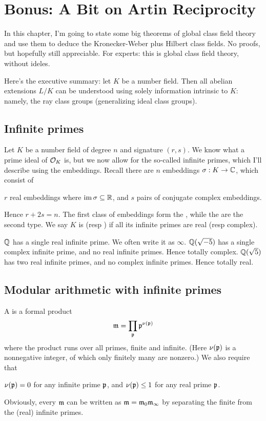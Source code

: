 \chapter{Bonus: A Bit on Artin Reciprocity}
In this chapter, I'm going to state some big theorems of
global class field theory and use them to deduce the
Kronecker-Weber plus Hilbert class fields.
No proofs, but hopefully still appreciable.
For experts: this is global class field theory, without ideles.

Here's the executive summary: let $K$ be a number field.
Then all abelian extensions $L/K$ can be understood
using solely information intrinsic to $K$:
namely, the ray class groups (generalizing ideal class groups).

\section{Infinite primes}
Let $K$ be a number field of degree $n$ and signature $(r,s)$.
We know what a prime ideal of $\mathcal O_K$ is,
but we now allow for the so-called infinite primes,
which I'll describe using the embeddings.
Recall there are $n$ embeddings $\sigma : K \to \mathbb C$, which consist of
\begin{itemize}
	\ii $r$ real embeddings where $\operatorname{im}\sigma \subseteq \mathbb R$, and
	\ii $s$ pairs of conjugate complex embeddings.
\end{itemize}
Hence $r+2s = n$.
The first class of embeddings form the ,
while the  are the second type.
We say $K$ is  (resp )
if all its infinite primes are real (resp complex).
\begin{example}
	\listhack
	\begin{itemize}
		\ii $\mathbb Q$ has a single real infinite prime.
		We often write it as $\infty$.
		\ii $\mathbb Q(\sqrt{-5})$ has a single complex infinite prime,
		and no real infinite primes. Hence totally complex.
		\ii $\mathbb Q(\sqrt{5})$ has two real infinite primes,
		and no complex infinite primes. Hence totally real.
	\end{itemize}
\end{example}

\section{Modular arithmetic with infinite primes}
A  is a formal product
\[ \mathfrak m = \prod_{\mathfrak p} \mathfrak p^{\nu(\mathfrak p)} \]
where the product runs over all primes, finite and infinite.
(Here $\nu(\mathfrak p)$ is a nonnegative integer,
of which only finitely many are nonzero.)
We also require that
\begin{itemize}
	\ii $\nu(\mathfrak p) = 0$ for any infinite prime $\mathfrak p$, and
	\ii $\nu(\mathfrak p) \le 1$ for any real prime $\mathfrak p$.
\end{itemize}
Obviously, every $\mathfrak m$ can be written as $\mathfrak m = \mathfrak m_0\mathfrak m_\infty$
by separating the finite from the (real) infinite primes.

